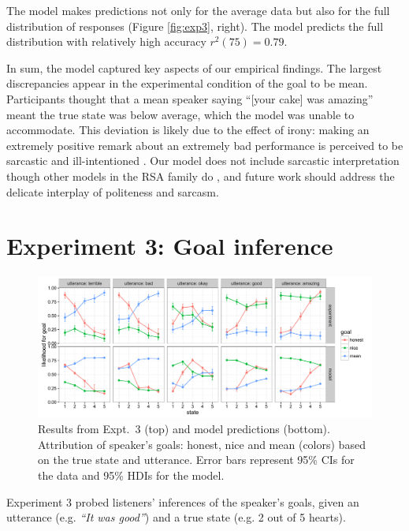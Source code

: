\documentclass[10pt,letterpaper]{article}
\begin{document}
The model makes predictions not only for the average data but also for the full distribution of responses (Figure \ref{fig:exp3}, right).
The model predicts the full distribution with relatively high accuracy $r^2(75) = 0.79$.

In sum, the model captured key aspects of our empirical findings.
The largest discrepancies appear in the experimental condition of the goal to be mean.
Participants thought that a mean speaker saying ``[your cake] was amazing'' meant the true state was below average, which the model was unable to accommodate.
This deviation is likely due to the effect of irony: making an extremely positive remark about an extremely bad performance is perceived to be sarcastic and ill-intentioned \cite{colston1997}.
Our model does not include sarcastic interpretation though other models in the RSA family do \cite{Kao2015}, and future work should address the delicate interplay of politeness and sarcasm.

\section{Experiment 3: Goal inference}

\begin{figure}[!t]
\begin{center}
  \includegraphics[width=\textwidth]{figures/exp3.pdf}
  \caption{\label{fig:exp2} Results from Expt.~3 (top) and model predictions (bottom). Attribution of speaker's goals: honest, nice and mean (colors) based on the true state and utterance. Error bars represent 95\% CIs for the data and 95\% HDIs for the model.}
  \end{center}
\end{figure}

Experiment 3 probed listeners' inferences of the speaker's goals, given an utterance (e.g. \emph{``It was good''}) and a true state (e.g. 2 out of 5 hearts).
\end{document}
